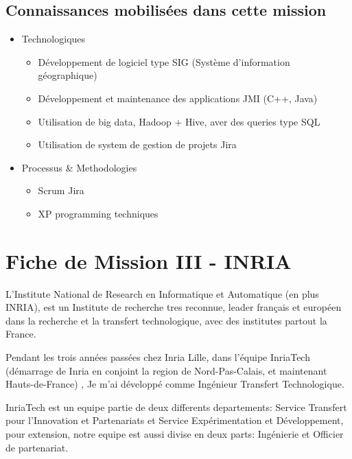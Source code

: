 \documentclass{resume} %
\begin{document}
\subsection {Connaissances mobilisées dans cette mission }
	

		
	\begin{itemize} 				
			\item Technologiques 
					\begin{itemize}
						\item Développement de logiciel type SIG (Système d'information géographique)
						\item Développement et maintenance des applications JMI (C++, Java) 
						\item Utilisation de big data, Hadoop + Hive, aver des queries type SQL
						\item Utilisation de system de gestion de projets Jira
					\end {itemize}
			\item Processus \& Methodologies 
					\begin{itemize}
						\item Scrum Jira
						\item XP programming techniques
					\end {itemize}
		\end{itemize}
		




\section{Fiche de Mission III - INRIA }

	L'Institute National de Research en Informatique et Automatique (en plus INRIA), est un Institute de recherche tres reconnue, leader français et européen dans la recherche et la transfert technologique, avec des institutes partout la France.
	
         Pendant les trois années passées chez Inria Lille, dans l'équipe InriaTech (démarrage de Inria en conjoint la region de Nord-Pas-Calais, et maintenant Hauts-de-France) ,   Je m'ai développé comme Ingénieur Transfert Technologique. 
         
    	InriaTech est un equipe partie de deux differents departements: Service Transfert pour l'Innovation et Partenariats et Service Expérimentation et Développement, pour extension, notre equipe est aussi divise en deux parts: Ingénierie et Officier de partenariat.   
	
\end{document}
